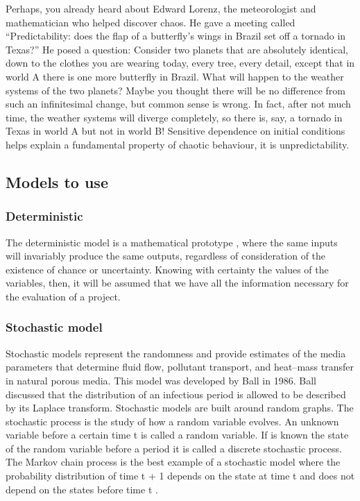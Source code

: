 \documentclass[11pt, letterpaper, english]{article}
\begin{document}
\begin{enumerate}
    \par{Perhaps, you already heard about Edward Lorenz, the meteorologist and mathematician who helped discover chaos. He gave a meeting called “Predictability: does the flap of a butterfly’s wings in Brazil set off a tornado in Texas?” He posed a question: Consider two planets that are absolutely identical, down to the clothes you are wearing today, every tree, every detail, except that in world A there is one more butterfly in Brazil. What will happen to the weather systems of the two planets? Maybe you thought  there will be no difference from such an infinitesimal change, but common sense is wrong. In fact, after not much time, the weather systems will diverge completely, so there is, say, a tornado in Texas in world A but not in world B! 
    Sensitive dependence on initial conditions helps explain a fundamental property of chaotic behaviour, it is unpredictability. \cite{garfinkel_shevtsov_guo_2017}}
    \end{enumerate}
\subsection{Models to use}



\subsubsection{Deterministic}

\par{The deterministic model is a mathematical prototype \cite{Witenberg_1995}, where the same inputs will invariably produce the same outputs, regardless of consideration of the existence of chance or uncertainty. Knowing with certainty the values of the variables, then, it will be assumed that we have all the information necessary for the evaluation of a project\cite{ramos_2019}.}

 \subsubsection{Stochastic model}

\par{Stochastic models represent the randomness and provide estimates of the media parameters that determine fluid flow, pollutant transport, and heat–mass transfer in natural porous media. This model was developed by Ball in 1986. Ball discussed that the distribution of an infectious period is allowed to be described by its Laplace transform. Stochastic models are built around random graphs. The stochastic process is the study of how a random variable evolves. An unknown variable before a certain time t is called a random variable. If is known the state of the random variable before a period it is called a discrete stochastic process. The Markov chain process is the best example of a stochastic model where the probability distribution of time t + 1 depends on the state at time t and does not depend on the states before time t \cite{stochastic_model_overview_sciencedirect} \cite{statistical_models_2003}.}
\end{document}
